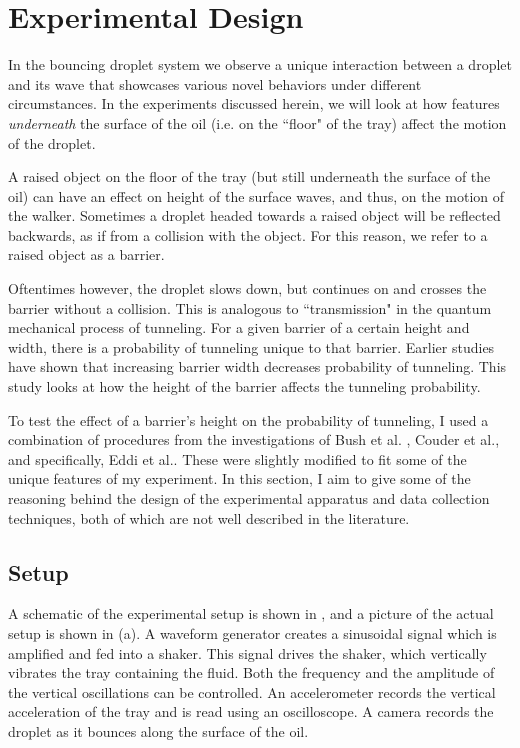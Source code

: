 \chapter{Experimental Design}
\label{Ch2}

In the bouncing droplet system we observe a unique interaction between a droplet and its wave that showcases various novel behaviors under different circumstances.  In the experiments discussed herein, we will look at how features \textit{underneath} the surface of the oil (i.e. on the ``floor" of the tray) affect the motion of the droplet. 

A raised object on the floor of the tray (but still underneath the surface of the oil) can have an effect on height of the surface waves, and thus, on the motion of the walker. Sometimes a droplet headed towards a raised object will be reflected backwards, as if from a collision with the object. For this reason, we refer to a raised object as a barrier. 

Oftentimes however, the droplet slows down, but continues on and crosses the barrier without a collision. This is analogous to ``transmission" in the quantum mechanical process of tunneling. For a given barrier of a certain height and width, there is a probability of tunneling unique to that barrier. Earlier studies have shown that increasing barrier width decreases probability of tunneling. This study looks at how the height of the barrier affects the tunneling probability. 

To test the effect of a barrier's height on the probability of tunneling, I used a combination of procedures from the investigations of Bush et al. , Couder et al., and specifically, Eddi et al.. These were slightly modified to fit some of the unique features of my experiment. In this section, I aim to give some of the reasoning behind the  design of the experimental apparatus and data collection techniques, both of which are not well described in the literature.

\section{Setup}
    A schematic of the experimental setup is shown in , and a picture of the actual setup is shown in (a). A waveform generator creates a sinusoidal signal which is amplified and fed into a shaker. This signal drives the shaker, which vertically vibrates the tray containing the fluid. Both the frequency and the amplitude of the vertical oscillations can be controlled. An accelerometer records the vertical acceleration of the tray and is read using an oscilloscope. A camera records the droplet as it bounces along the surface of the oil.  
    
